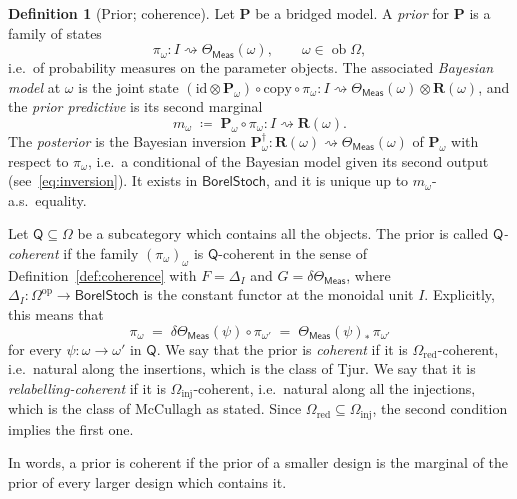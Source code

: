 \documentclass[11pt,a4paper]{article}
\theoremstyle{plain}
\theoremstyle{definition}
\newtheorem{definition}[theorem]{Definition}
\theoremstyle{remark}
\newcommand{\cat}[1]{\mathsf{#1}}
\newcommand{\catO}{\cat{\Omega}}
\newcommand{\Meas}{\cat{Meas}}
\newcommand{\op}{\mathrm{op}}
\newcommand{\id}{\mathrm{id}}
\newcommand{\del}{\delta}
\DeclareMathOperator{\ob}{ob}
\newcommand{\BorelStoch}{\cat{BorelStoch}}
\begin{document}
\begin{definition}[Prior; coherence]\label{def:prior}
Let $\mathbf P$ be a bridged model. A \emph{prior} for $\mathbf P$ is a family
of states
\[
\pi_{\omega} \colon I \rightsquigarrow \Theta_\Meas(\omega),
\qquad \omega \in \ob\catO ,
\]
i.e.\ of probability measures on the parameter objects. The associated
\emph{Bayesian model} at $\omega$ is the joint state
$(\id \otimes \mathbf P_{\omega}) \circ \mathrm{copy} \circ \pi_{\omega}
\colon I \rightsquigarrow \Theta_\Meas(\omega) \otimes \mathbf{R}(\omega)$,
and the \emph{prior predictive} is its second marginal
\[
m_{\omega} \;\coloneqq\; \mathbf P_{\omega} \circ \pi_{\omega}
\colon I \rightsquigarrow \mathbf{R}(\omega).
\]
The \emph{posterior} is the Bayesian inversion
$\mathbf P_{\omega}^{\dagger} \colon \mathbf{R}(\omega) \rightsquigarrow
\Theta_\Meas(\omega)$ of $\mathbf P_{\omega}$ with respect to $\pi_{\omega}$,
i.e.\ a conditional of the Bayesian model given its second output
(see~\eqref{eq:inversion}). It exists in $\BorelStoch$, and it is unique up to
$m_{\omega}$-a.s.\ equality.

Let $\cat{Q} \subseteq \catO$ be a subcategory which contains all the objects.
The prior is called \emph{$\cat{Q}$-coherent} if the family
$(\pi_{\omega})_{\omega}$ is $\cat{Q}$-coherent in the sense of
Definition~\ref{def:coherence} with $F = \Delta_{I}$ and
$G = \del\Theta_\Meas$, where
$\Delta_{I} \colon \catO^{\op} \to \BorelStoch$ is the constant functor at the
monoidal unit $I$. Explicitly, this means that
\begin{equation}\label{eq:priorsquare}
\pi_{\omega} \;=\; \del\Theta_\Meas(\psi)\circ\pi_{\omega'}
\;=\; \Theta_\Meas(\psi)_{*}\,\pi_{\omega'}
\end{equation}
for every $\psi \colon \omega \to \omega'$ in $\cat{Q}$. We say that the prior
is \emph{coherent} if it is $\catO_{\mathrm{red}}$-coherent, i.e.\ natural
along the insertions, which is the class of Tjur. We say that it is
\emph{relabelling-coherent} if it is $\catO_{\mathrm{inj}}$-coherent, i.e.\
natural along all the injections, which is the class of McCullagh as stated.
Since $\catO_{\mathrm{red}} \subseteq \catO_{\mathrm{inj}}$, the second
condition implies the first one.
\end{definition}

In words, a prior is coherent if the prior of a smaller design is the marginal
of the prior of every larger design which contains it.
\end{document}
